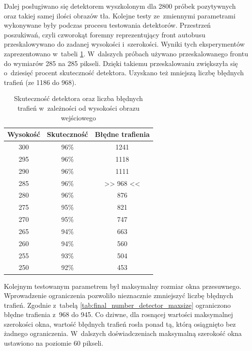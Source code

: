 Dalej posługiwano się detektorem wyszkolonym dla 2800 próbek pozytywnych
oraz takiej samej ilości obrazów tła. Kolejne testy ze~zmiennymi
parametrami
wykonywane były podczas procesu testowania detektorów. 
Przestrzeń poszukiwań, czyli czworokąt foremny reprezentujący
front autobusu przeskalowywano do zadanej wysokości i~szerokości.
Wyniki tych eksperymentów zaprezentowano w~tabeli 
\ref{tab:final_number_detector_resize}.
W~dalszych próbach używano przeskalowanego frontu do wymiarów
285 na 285 pikseli. Dzięki takiemu przeskalowaniu zwiększyła
się o~dziesięć procent skuteczność detektora. Uzyskano też
mniejszą liczbę błędnych trafień (ze 1186 do 968).

\begin{table}[!h]
    \centering
    \begin{tabular}{c|c|c}
        Wysokość & Skuteczność & Błędne trafienia
        \\ \hline
        300 & 96\% & 1241 \\
        295 & 96\% & 1118 \\
        290 & 96\% & 1111 \\
        285 & 96\% & >> 968 <<\\
        280 & 96\% & 876 \\
        275 & 95\% & 821 \\
        270 & 95\% & 747 \\
        265 & 94\% & 663 \\
        260 & 94\% & 560 \\
        255 & 93\% & 504 \\
        250 & 92\% & 453 \\
    \end{tabular}
    \caption{Skuteczność detektora oraz liczba błędnych trafień
    w~zależności od wysokości obrazu wejściowego}
    \label{tab:final_number_detector_resize}
\end{table}

Kolejnym testowanym parametrem był maksymalny rozmiar okna przesuwnego.
Wprowadzenie ograniczenia pozwoliło nieznacznie zmniejszyć
liczbę błędnych trafień. Zgodnie z~tabelą
\ref{tab:final_number_detector_maxsize} ograniczono 
błędne trafienia z~968 do 945. Co dziwne, dla rosnącej 
wartości maksymalnej szerokości okna, wartość błędnych
trafień rosła ponad tą, którą osiągnięto bez żadnego
ograniczenia. W~dalszych doświadczeniach maksymalną szerokość
okna ustawiono na poziomie 60 pikseli.


